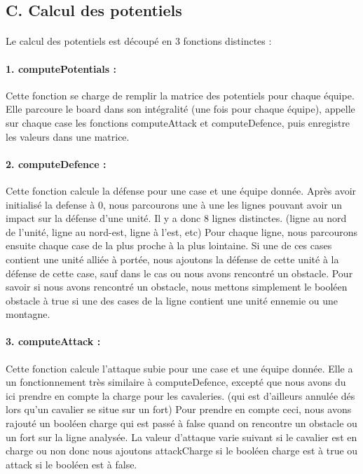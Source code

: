 \documentclass[12pt]{article}
\begin{document}
		\subsection{C. Calcul des potentiels}
		
		\paragraph{}
		Le calcul des potentiels est découpé en 3 fonctions distinctes :
		
		\paragraph{1. computePotentials : }
		Cette fonction se charge de remplir la matrice des potentiels pour chaque équipe.
		Elle parcoure le board dans son intégralité (une fois pour chaque équipe), appelle sur chaque case les fonctions computeAttack et 
		computeDefence, puis enregistre les valeurs dans une matrice.
		
		\paragraph{2. computeDefence : }
		Cette fonction calcule la défense pour une case et une équipe donnée.
		Après avoir initialisé la defense à 0, nous parcourons une à une les lignes pouvant avoir un impact sur la défense d'une unité.
		Il y a donc 8 lignes distinctes. (ligne au nord de l'unité, ligne au nord-est, ligne à l'est, etc)
		Pour chaque ligne, nous parcourons ensuite chaque case de la plus proche à la plus lointaine.
		Si une de ces cases contient une unité alliée à portée, nous ajoutons la défense de cette unité à la défense de cette case, 
		sauf dans le cas ou nous avons rencontré un obstacle.
		Pour savoir si nous avons rencontré un obstacle, nous mettons simplement le booléen obstacle à true si une des cases de la 
		ligne contient une unité ennemie ou une montagne.
		
		\paragraph{3. computeAttack : }
		Cette fonction calcule l'attaque subie pour une case et une équipe donnée.
		Elle a un fonctionnement très similaire à computeDefence, excepté que nous avons du ici prendre en compte la charge pour les cavaleries. 
		(qui est d'ailleurs annulée dés lors qu'un cavalier se situe sur un fort)
		Pour prendre en compte ceci, nous avons rajouté un booléen charge qui est passé à false quand on rencontre un obstacle 
		ou un fort sur la ligne analysée.
		La valeur d'attaque varie suivant si le cavalier est en charge ou non donc nous ajoutons attackCharge si le booléen charge est 
		à true ou attack si le booléen est à false.
		
\end{document}
